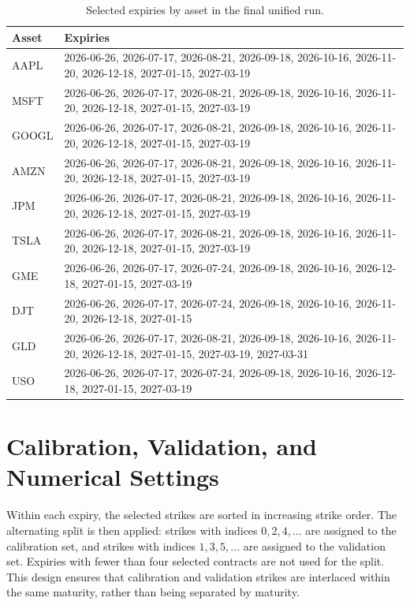 \documentclass[11pt,a4paper]{report}
\begin{document}
{\small
\begin{longtable}{p{}p{}}
\caption{Selected expiries by asset in the final unified run.}
\label{tab:repro_selected_expiries}\\
\toprule
Asset & Expiries \\
\midrule
AAPL & 2026-06-26, 2026-07-17, 2026-08-21, 2026-09-18, 2026-10-16, 2026-11-20, 2026-12-18, 2027-01-15, 2027-03-19 \\
MSFT & 2026-06-26, 2026-07-17, 2026-08-21, 2026-09-18, 2026-10-16, 2026-11-20, 2026-12-18, 2027-01-15, 2027-03-19 \\
GOOGL & 2026-06-26, 2026-07-17, 2026-08-21, 2026-09-18, 2026-10-16, 2026-11-20, 2026-12-18, 2027-01-15, 2027-03-19 \\
AMZN & 2026-06-26, 2026-07-17, 2026-08-21, 2026-09-18, 2026-10-16, 2026-11-20, 2026-12-18, 2027-01-15, 2027-03-19 \\
JPM & 2026-06-26, 2026-07-17, 2026-08-21, 2026-09-18, 2026-10-16, 2026-11-20, 2026-12-18, 2027-01-15, 2027-03-19 \\
TSLA & 2026-06-26, 2026-07-17, 2026-08-21, 2026-09-18, 2026-10-16, 2026-11-20, 2026-12-18, 2027-01-15, 2027-03-19 \\
GME & 2026-06-26, 2026-07-17, 2026-07-24, 2026-09-18, 2026-10-16, 2026-12-18, 2027-01-15, 2027-03-19 \\
DJT & 2026-06-26, 2026-07-17, 2026-07-24, 2026-09-18, 2026-10-16, 2026-11-20, 2026-12-18, 2027-01-15 \\
GLD & 2026-06-26, 2026-07-17, 2026-08-21, 2026-09-18, 2026-10-16, 2026-11-20, 2026-12-18, 2027-01-15, 2027-03-19, 2027-03-31 \\
USO & 2026-06-26, 2026-07-17, 2026-07-24, 2026-09-18, 2026-10-16, 2026-12-18, 2027-01-15, 2027-03-19 \\
\bottomrule
\end{longtable}
}

\section{Calibration, Validation, and Numerical Settings}

Within each expiry, the selected strikes are sorted in increasing strike order. The alternating split is then applied: strikes with indices $0,2,4,\dots$ are assigned to the calibration set, and strikes with indices $1,3,5,\dots$ are assigned to the validation set. Expiries with fewer than four selected contracts are not used for the split. This design ensures that calibration and validation strikes are interlaced within the same maturity, rather than being separated by maturity.
\end{document}
